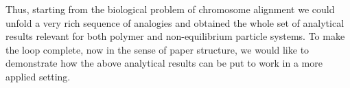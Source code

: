 \documentclass[aps,showpacs,twocolumn,floatfix,prx,superscriptaddress]{revtex4-1}
\begin{document}
%
%
%
%
%
%
%


Thus, starting from the biological problem of chromosome alignment we could unfold a very rich sequence of analogies and obtained the whole set of analytical results relevant for both polymer and non-equilibrium particle systems. To make the loop complete, now in the sense of paper structure, we would like to demonstrate how the above analytical results can be put to work in a more applied setting.
\end{document}
